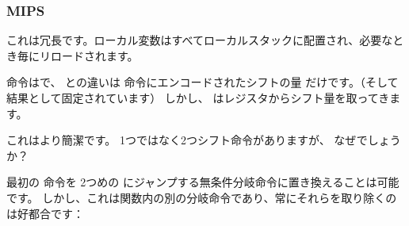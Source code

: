 ﻿\subsubsection{MIPS}





これは冗長です。ローカル変数はすべてローカルスタックに配置され、必要なとき毎にリロードされます。

\SLLV 命令はで、 \SLL との違いは \SLL 命令にエンコードされたシフトの量
だけです。（そして結果として固定されています）
しかし、 \SLLV はレジスタからシフト量を取ってきます。


これはより簡潔です。
1つではなく2つシフト命令がありますが、
なぜでしょうか？

最初の \SLLV 命令を 2つめの \SLLV にジャンプする無条件分岐命令に置き換えることは可能です。
しかし、これは関数内の別の分岐命令であり、常にそれらを取り除くのは好都合です：



